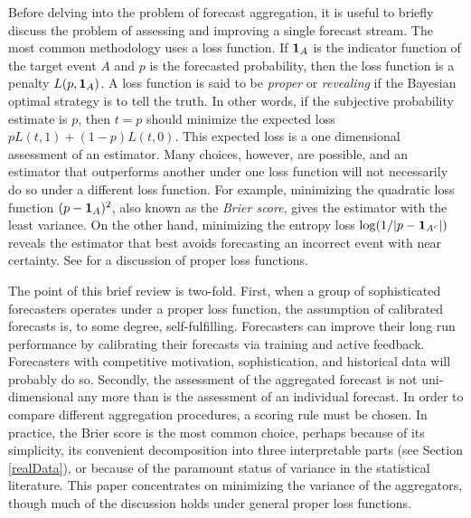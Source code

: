 \documentclass[12pt]{article}
\theoremstyle{definition}
\theoremstyle{definition}
\def\one{{\bf 1}}
\begin{document}
Before delving into the problem of forecast aggregation, it is useful
to briefly discuss the problem of assessing and improving a single
forecast stream.  The most common methodology uses a loss
function. If $\one_A$ is the indicator function of the target event
$A$ and $p$ is the forecasted probability, then the loss function is a penalty $L(p , \one_A)$.  A loss function is said to
be {\em proper} or {\em revealing} if the Bayesian optimal strategy is
to tell the truth.  In other words, if the subjective probability
estimate is $p$, then $t = p$ should minimize the expected loss $p
L(t,1) + (1-p) L(t,0)$.  This expected loss is a one dimensional
assessment of an estimator. Many choices, however, are possible, and
an estimator that outperforms another under one loss function will not
necessarily do so under a different loss function.  For example,
minimizing the quadratic loss function $(p - \one_A)^2$, also known as
the {\em Brier score}, gives the estimator with the least variance. On
the other hand, minimizing the entropy loss $\log (1 / |p -
\one_{A^c}|)$ reveals the estimator that best avoids forecasting an
incorrect event with near certainty. See  \cite{HwPe1997}
for a discussion of proper loss functions.

The point of this brief review is two-fold.  First, when a group of
sophisticated forecasters operates under a proper loss function,
the assumption of calibrated forecasts is, to some degree,
self-fulfilling.  Forecasters can improve their long run performance
by calibrating their forecasts via training and active
feedback. Forecasters with competitive
motivation, sophistication, and historical data will probably do so. Secondly, the
assessment of the aggregated forecast is not uni-dimensional any more
than is the assessment of an individual forecast.  In order to compare
different aggregation procedures, a scoring rule must be chosen.  In
practice, the Brier score is the most common choice, perhaps because
of its simplicity, its convenient decomposition into three
interpretable parts (see Section \ref{realData}), or because of the
paramount status of variance in the statistical literature. This paper concentrates on minimizing the variance of the aggregators, though
 much of the discussion holds under general proper loss
functions.
\end{document}
